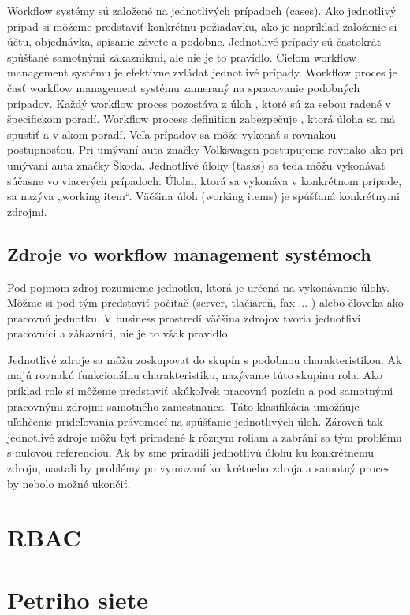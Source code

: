 Workflow systémy sú založené na jednotlivých prípadoch (cases). Ako jednotlivý prípad si môžeme predstaviť 	 konkrétnu požiadavku, ako je napríklad založenie si účtu, objednávka, spísanie závete a podobne. Jednotlivé prípady sú častokrát spúšťané samotnými zákazníkmi, ale nie je to pravidlo. Cieľom workflow management systému je efektívne zvládať jednotlivé prípady. Workflow proces je časť workflow management systému zameraný na spracovanie podobných prípadov. Každý workflow proces pozostáva z úloh , ktoré sú za sebou radené v špecifickom poradí. Workflow process definition zabezpečuje , ktorá úloha sa má spustiť a v akom poradí. Veľa prípadov sa môže vykonať s rovnakou postupnosťou. Pri umývaní auta značky Volkswagen postupujeme rovnako ako pri umývaní auta značky Škoda. Jednotlivé úlohy (tasks) sa teda môžu vykonávať súčasne vo viacerých prípadoch. Úloha, ktorá sa vykonáva v konkrétnom prípade, sa nazýva „working item“. Väčšina úloh (working items) je spúšťaná  konkrétnymi zdrojmi. \cite{workflow_systemy}



\subsection{Zdroje vo workflow management systémoch}
Pod pojmom zdroj rozumieme jednotku, ktorá je určená na vykonávanie úlohy. Môžme si pod tým predstaviť počítač (server, tlačiareň, fax ... ) alebo človeka ako pracovnú jednotku. V business prostredí väčšina zdrojov tvoria jednotliví pracovníci a zákazníci, nie je to však pravidlo.

Jednotlivé zdroje sa môžu zoskupovať do skupín s podobnou charakteristikou. Ak majú rovnakú funkcionálnu charakteristiku, nazývame túto skupinu rola.
Ako príklad role si môžeme predstaviť akúkoľvek pracovnú pozíciu a pod samotnými pracovnými zdrojmi samotného zamestnanca. Táto klasifikácia umožňuje uľahčenie prideľovania právomocí na spúšťanie jednotlivých úloh. Zároveň tak jednotlivé zdroje môžu byť priradené k rôznym roliam a zabráni sa tým problému s nulovou referenciou. Ak by sme priradili jednotlivú úlohu ku konkrétnemu zdroju, nastali by problémy po vymazaní konkrétneho zdroja a samotný proces by nebolo možné ukončiť.


\section{RBAC}




\section{Petriho siete}

